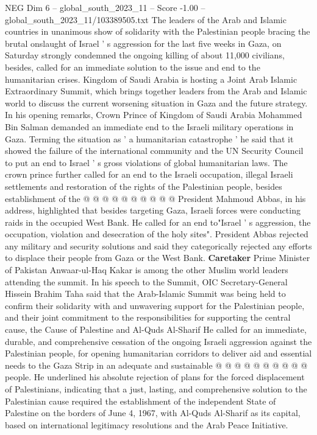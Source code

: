 \begin{textsample}{NEG Dim 6 – global\_south\_2023\_11 – Score -1.00 – global\_south\_2023\_11/103389505.txt}  \label{ex:f6_neg_156}
The leaders of the Arab and Islamic countries in unanimous show of solidarity with the Palestinian people bracing the brutal onslaught of Israel ' s aggression for the last five weeks in Gaza, on Saturday strongly condemned the ongoing killing of about 11,000 civilians, besides, called for an immediate solution to the issue and end to the humanitarian crises.
Kingdom of Saudi Arabia is hosting a Joint Arab Islamic Extraordinary Summit, which brings together leaders from the Arab and Islamic world to discuss the current worsening situation in Gaza and the future strategy.
In his opening remarks, Crown Prince of Kingdom of Saudi Arabia Mohammed Bin Salman demanded an immediate end to the Israeli military operations in Gaza.
Terming the situation as ' a humanitarian catastrophe ' he said that it showed the failure of the international community and the UN Security Council to put an end to Israel ' s gross violations of global humanitarian laws.
The crown prince further called for an end to the Israeli occupation, illegal Israeli settlements and restoration of the rights of the Palestinian people, besides establishment of the @ @ @ @ @ @ @ @ @ @ President Mahmoud Abbas, in his address, highlighted that besides targeting Gaza, Israeli forces were conducting raids in the occupied West Bank.
He called for an end to"Israel ' s aggression, the occupation, violation and desecration of the holy sites".
President Abbas rejected any military and security solutions and said they categorically rejected any efforts to displace their people from Gaza or the West Bank. \textbf{Caretaker} Prime Minister of Pakistan Anwaar-ul-Haq Kakar is among the other Muslim world leaders attending the summit.
In his speech to the Summit, OIC Secretary-General Hissein Brahim Taha said that the Arab-Islamic Summit was being held to confirm their solidarity with and unwavering support for the Palestinian people, and their joint commitment to the responsibilities for supporting the central cause, the Cause of Palestine and Al-Quds Al-Sharif He called for an immediate, durable, and comprehensive cessation of the ongoing Israeli aggression against the Palestinian people, for opening humanitarian corridors to deliver aid and essential needs to the Gaza Strip in an adequate and sustainable @ @ @ @ @ @ @ @ @ @ people.
He underlined his absolute rejection of plans for the forced displacement of Palestinians, indicating that a just, lasting, and comprehensive solution to the Palestinian cause required the establishment of the independent State of Palestine on the borders of June 4, 1967, with Al-Quds Al-Sharif as its capital, based on international legitimacy resolutions and the Arab Peace Initiative.

\end{textsample}
